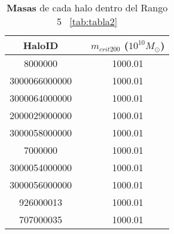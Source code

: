 \begin{table}[H]
\begin{center}
\begin{tabular}{ccc}
\toprule
\cellcolor[gray]{0.9}HaloID & & \cellcolor[gray]{0.9}$m_{crit200}$ ($10^{10}M_\odot$) \\
\midrule
8000000 & & 1000.01 \\
\midrule
3000066000000 & & 1000.01 \\
\midrule
3000064000000 & & 1000.01 \\
\midrule
2000029000000 & & 1000.01 \\
\midrule
3000058000000 & & 1000.01 \\
\midrule
7000000 & & 1000.01 \\
\midrule
3000054000000 & & 1000.01 \\
\midrule
3000056000000 & & 1000.01 \\
\midrule
926000013 & & 1000.01 \\
\midrule
707000035 & & 1000.01 \\
\bottomrule
\end{tabular}
\end{center}
\caption{\textbf{Masas} de cada halo dentro del Rango 5 ~\ref{tab:tabla2}}
\label{tab:tabla3}
\end{table}

